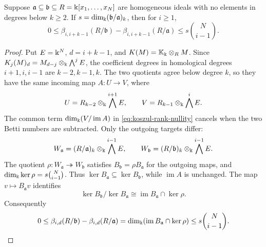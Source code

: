 \begin{lemma}\label{grow:koszul-comparison}
Suppose $\mathfrak a\subseteq\mathfrak b\subseteq R=\Bbbk[x_1,\ldots,x_N]$ are homogeneous
ideals with no elements in degrees below $k\ge2$. If
$s=\dim_\Bbbk(\mathfrak b/\mathfrak a)_k$, then for $i\ge1$,
\[
 0\le\beta_{i,i+k-1}(R/\mathfrak b)-\beta_{i,i+k-1}(R/\mathfrak a)
       \le s\binom N{i-1}.
\]
\end{lemma}
\begin{proof}
Put $E=\Bbbk^N$, $d=i+k-1$, and $K(M)=\mathbb K_{\Bbbk}\otimes_R M$.
Since $K_j(M)_d=M_{d-j}\otimes_\Bbbk\bigwedge^jE$, the coefficient
degrees in homological degrees $i+1,i,i-1$ are $k-2,k-1,k$.
The two quotients agree below degree $k$, so they have the same
incoming map $A:U\to V$, where
\[
 U=R_{k-2}\otimes_\Bbbk\bigwedge^{i+1}E,\qquad
 V=R_{k-1}\otimes_\Bbbk\bigwedge^iE.
\]
The common term $\dim_\Bbbk(V/\operatorname{im}A)$ in
\eqref{eq:koszul-rank-nullity} cancels when the two Betti numbers are
subtracted. Only the outgoing targets differ:
\[
 W_{\mathfrak a}=(R/\mathfrak a)_k\otimes_\Bbbk\bigwedge^{i-1}E,
 \qquad
 W_{\mathfrak b}=(R/\mathfrak b)_k\otimes_\Bbbk\bigwedge^{i-1}E.
\]
The quotient $\rho:W_{\mathfrak a}\twoheadrightarrow W_{\mathfrak b}$
satisfies $B_{\mathfrak b}=\rho B_{\mathfrak a}$ for the outgoing maps,
and $\dim_\Bbbk\ker\rho=s\binom N{i-1}$. Thus
$\ker B_{\mathfrak a}\subseteq\ker B_{\mathfrak b}$, while
$\operatorname{im}A$ is unchanged. The map $v\mapsto B_{\mathfrak a}v$
identifies
\[
 \ker B_{\mathfrak b}/\ker B_{\mathfrak a}
 \cong\operatorname{im}B_{\mathfrak a}\cap\ker\rho.
\]
Consequently
\[
 0\le\beta_{i,d}(R/\mathfrak b)-\beta_{i,d}(R/\mathfrak a)
 =\dim_\Bbbk(\operatorname{im}B_{\mathfrak a}\cap\ker\rho)
 \le s\binom N{i-1}.
\]
\end{proof}

